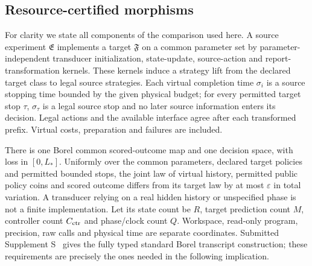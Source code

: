 \subsection{Resource-certified morphisms}
For clarity we state all components of the comparison used here. A source experiment $\mathfrak E$ implements a target $\mathfrak F$ on a common parameter set by parameter-independent transducer initialization, state-update, source-action and report-transformation kernels. These kernels induce a strategy lift from the declared target class to legal source strategies. Each virtual completion time $\sigma_i$ is a source stopping time bounded by the given physical budget; for every permitted target stop $\tau$, $\sigma_\tau$ is a legal source stop and no later source information enters its decision. Legal actions and the available interface agree after each transformed prefix. Virtual costs, preparation and failures are included.

There is one Borel common scored-outcome map and one decision space, with loss in $[0,L_*]$. Uniformly over the common parameters, declared target policies and permitted bounded stops, the joint law of virtual history, permitted public policy coins and scored outcome differs from its target law by at most $\varepsilon$ in total variation. A transducer relying on a real hidden history or unspecified phase is not a finite implementation. Let its state count be $R$, target prediction count $M$, controller count $C_{\rm ctr}$ and phase/clock count $Q$. Workspace, read-only program, precision, raw calls and physical time are separate coordinates. Submitted Supplement S~\cite{companion} gives the fully typed standard Borel transcript construction; these requirements are precisely the ones needed in the following implication.

